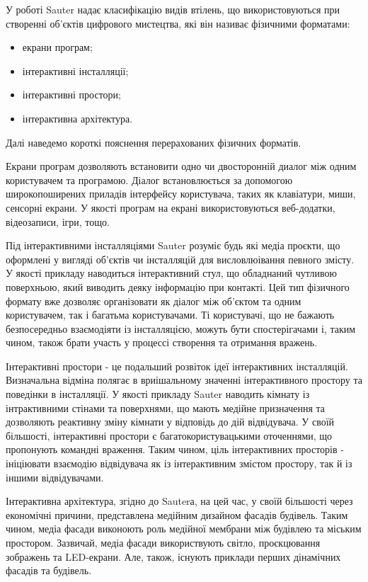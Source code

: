 \documentclass[a4paper,ukrainian,utf8,nocolumnsxix,floatsection,equationsection]{eskdtext}
\begin{document}
У роботі  Sauter надає класифікацію видів втілень, що використовуються при створенні об’єктів цифрового мистецтва, які він називає фізичними форматами:

\begin{itemize}
	\item екрани програм;
	\item інтерактивні інсталляції;
	\item інтерактивні простори;
	\item інтерактивна архітектура.
\end{itemize}

Далі наведемо короткі пояснення перерахованих фізичних форматів.

Екрани програм дозволяють встановити одно чи двосторонній диалог між одним користувачем та програмою. Діалог встановлюється за допомогою широкопоширених приладів інтерфейсу користувача, таких як клавіатури, миши, сенсорні екрани. У якості програм на екрані використовуються веб-додатки, відеозаписи, ігри, тощо.

Під інтерактивними інсталляціями Sauter розуміє будь які медіа проєкти, що оформлені у вигляді об’єктів чи інсталляцій для висловлюівання певного змісту. У якості прикладу наводиться інтерактивний стул, що обладнаний чутливою поверхньою, який виводить деяку інформацію при контакті. Цей тип фізичного формату вже дозволяє організовати як діалог між об’єктом та одним користувачем, так і багатьма користувачами. Ті користувачі, що не бажають безпосередньо взаємодіяти із інсталляцією, можуть бути спостерігачами і, таким чином, також брати участь у процессі створення та отримання вражень. 

Інтерактивні простори - це подальший розвіток ідеї інтерактивних інсталляцій. Визначальна відміна полягає в вриішальному значенні інтерактивного простору та поведінки в інсталляції. У якості прикладу Sauter наводить кімнату із інтрактивними стінами та поверхнями, що мають медійне призначення та дозволяють реактивну зміну кімнати у відповідь до дій відвідувача. У своїй більшості, інтерактивні простори є багатокористувацькими оточеннями, що пропонують командні враження. Таким чином, ціль інтерактивних просторів - ініціювати взаємодію відвідувача як із інтерактивним змістом простору, так й із іншими відвідувачами.

Інтерактивна архітектура, згідно до Sauterа, на цей час, у своїй більшості через економічні причини, представлена медійним дизайном фасадів будівель. Таким чином, медіа фасади виконоють роль медійної мембрани між будівлею та міським простором. Зазвичай, медіа фасади використвують світло, проєкцювання зображень та LED-екрани. Але, також, існують приклади перших дінамічних фасадів та будівель.
\end{document}
